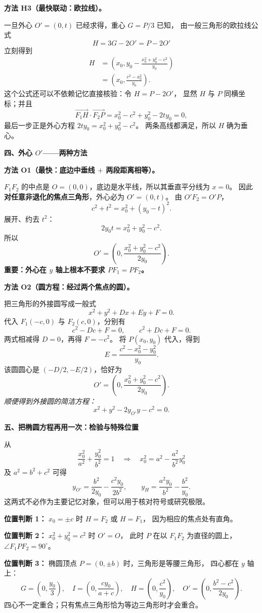 \begin{proofbox}
\medskip
\textbf{方法 H3（最快联动：欧拉线）。}

一旦外心 $O'=(0,t)$ 已经求得，重心 $G=P/3$ 已知，
由一般三角形的欧拉线公式
\[
 H=3G-2O'=P-2O'
\]
立刻得到
\begin{align*}
 H
 &=\left(x_0,y_0-\frac{x_0^2+y_0^2-c^2}{y_0}\right)\\
 &=\boxed{\left(x_0,\frac{c^2-x_0^2}{y_0}\right)}.
\end{align*}
这个公式还可以不依赖记忆直接核验：令 $H=P-2O'$，
显然 $H$ 与 $P$ 同横坐标；并且
\[
 \overrightarrow{F_1H}\cdot\overrightarrow{F_2P}
 =x_0^2-c^2+y_0^2-2ty_0=0,
\]
最后一步正是外心方程 $2ty_0=x_0^2+y_0^2-c^2$。
两条高线都满足，所以 $H$ 确为垂心。

\tcbline
\textbf{四、外心 $O'$——两种方法}

\textbf{方法 O1（最快：底边中垂线 $+$ 两段距离相等）。}

$F_1F_2$ 的中点是 $O=(0,0)$，底边是水平线，所以其垂直平分线为 $x=0$。
因此\textbf{对任意非退化的焦点三角形}，外心必为 $O'=(0,t)$。
由 $O'F_2=O'P$，
\[
 c^2+t^2=x_0^2+(y_0-t)^2.
\]
展开、约去 $t^2$：
\[
 2y_0t=x_0^2+y_0^2-c^2.
\]
所以
\[
 \boxed{O'=\left(0,\frac{x_0^2+y_0^2-c^2}{2y_0}\right)}.
\]
\textbf{重要：外心在 $y$ 轴上根本不要求 $PF_1=PF_2$。}

\medskip
\textbf{方法 O2（圆方程：经过两个焦点的圆）。}

把三角形的外接圆写成一般式
\[
 x^2+y^2+Dx+Ey+F=0.
\]
代入 $F_1(-c,0)$ 与 $F_2(c,0)$，分别有
\[
 c^2-Dc+F=0,\qquad c^2+Dc+F=0.
\]
两式相减得 $D=0$，再得 $F=-c^2$。
将 $P(x_0,y_0)$ 代入，得到
\[
 E=\frac{c^2-x_0^2-y_0^2}{y_0}.
\]
该圆圆心是 $(-D/2,-E/2)$，恰好为
\[
 O'=\left(0,\frac{x_0^2+y_0^2-c^2}{2y_0}\right).
\]
\textit{顺便得到外接圆的简洁方程：}
\[
 \boxed{x^2+y^2-2y_{O'}y-c^2=0}.
\]

\tcbline
\textbf{五、把椭圆方程再用一次：检验与特殊位置}

从
\[
 \frac{x_0^2}{a^2}+\frac{y_0^2}{b^2}=1
 \quad\Longrightarrow\quad
 x_0^2=a^2-\frac{a^2}{b^2}y_0^2
\]
及 $a^2=b^2+c^2$ 可得
\[
 \boxed{y_{O'}=\frac{b^2}{2y_0}-\frac{c^2y_0}{2b^2}},
 \qquad
 \boxed{y_H=\frac{a^2y_0}{b^2}-\frac{b^2}{y_0}}.
\]
这两式不必作为主要记忆对象，但可以用于核对符号或研究极限。

\textbf{位置判断 1：} $x_0=\pm c$ 时 $H=F_2$ 或 $H=F_1$，
因为相应的焦点处有直角。

\textbf{位置判断 2：} $x_0^2+y_0^2=c^2$ 时 $O'=O$，
此时 $P$ 在以 $F_1F_2$ 为直径的圆上，$\angle F_1PF_2=90^\circ$。

\textbf{位置判断 3：} 椭圆顶点 $P=(0,\pm b)$ 时，三角形是等腰三角形，
四心都在 $y$ 轴上：
\[
 G=\left(0,\frac{y_0}{3}\right),\quad
 I=\left(0,\frac{cy_0}{a+c}\right),\quad
 H=\left(0,\frac{c^2}{y_0}\right),\quad
 O'=\left(0,\frac{b^2-c^2}{2y_0}\right).
\]
四心不一定重合；只有焦点三角形恰为等边三角形时才会重合。
\end{proofbox}

